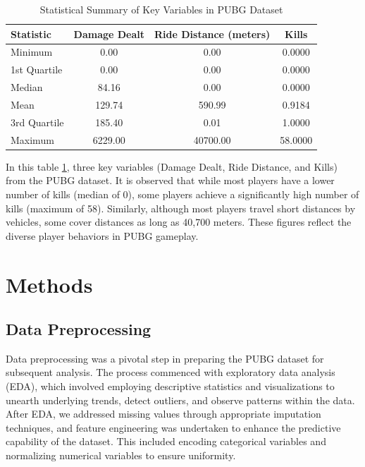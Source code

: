 \documentclass[12pt]{article}
\begin{document}
\begin{table}[h!]
	
	\centering
	\begin{tabular}{|l|c|c|c|}
		\hline
		\textbf{Statistic} & \textbf{Damage Dealt} & \textbf{Ride Distance (meters)} & \textbf{Kills} \\ \hline
		Minimum            & 0.00                  & 0.00                           & 0.0000         \\ \hline
		1st Quartile       & 0.00                  & 0.00                           & 0.0000         \\ \hline
		Median             & 84.16                 & 0.00                           & 0.0000         \\ \hline
		Mean               & 129.74                & 590.99                         & 0.9184         \\ \hline
		3rd Quartile       & 185.40                & 0.01                           & 1.0000         \\ \hline
		Maximum            & 6229.00               & 40700.00                       & 58.0000        \\ \hline
	\end{tabular}
	\caption{Statistical Summary of Key Variables in PUBG Dataset}
	\label{table:stats_summary}
\end{table}

In this table \ref{table:stats_summary}, three key variables (Damage Dealt, Ride Distance, and Kills) from the PUBG dataset. It is observed that while most players have a lower number of kills (median of 0), some players achieve a significantly high number of kills (maximum of 58). Similarly, although most players travel short distances by vehicles, some cover distances as long as 40,700 meters. These figures reflect the diverse player behaviors in PUBG gameplay.






\section{Methods}

\subsection{Data Preprocessing}
Data preprocessing was a pivotal step in preparing the PUBG dataset for subsequent analysis. The process commenced with exploratory data analysis (EDA), which involved employing descriptive statistics and visualizations to unearth underlying trends, detect outliers, and observe patterns within the data. After EDA, we addressed missing values through appropriate imputation techniques, and feature engineering was undertaken to enhance the predictive capability of the dataset. This included encoding categorical variables and normalizing numerical variables to ensure uniformity.
\end{document}
